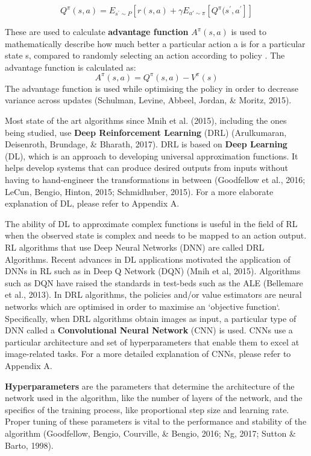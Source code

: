 \[ Q^{\pi}(s,a) = E_{s^{\prime} \sim P}[r(s,a) + \gamma E_{a\prime \sim \pi}[Q^{\pi}(s^{\prime}, a^{\prime}]] \]

These are used to calculate \textbf{advantage function} $A^{\pi}(s,a)$  is used to mathematically describe how much better a particular action a is for a particular state s, compared to randomly selecting an action according to policy . The advantage function is calculated as:  
\[ A^{\pi}(s,a) = Q^{\pi}(s,a) - V^{\pi}(s) \]
The advantage function is used while optimising the policy in order to decrease variance across updates (Schulman, Levine, Abbeel, Jordan, \& Moritz, 2015).

Most state of the art algorithms since Mnih et al. (2015), including the ones being studied, use \textbf{Deep Reinforcement Learning} (DRL) (Arulkumaran, Deisenroth, Brundage, \& Bharath, 2017). DRL is based on \textbf{Deep Learning} (DL), which is an approach to developing universal approximation functions. It helps develop systems that can produce desired outputs from inputs without having to hand-engineer the transformations in between (Goodfellow et al., 2016; LeCun, Bengio, Hinton, 2015; Schmidhuber, 2015). For a more elaborate explanation of DL, please refer to Appendix A.

The ability of DL to approximate complex functions is useful in the field of RL when the observed state is complex and needs to be mapped to an action output. RL algorithms that use Deep Neural Networks (DNN) are called DRL Algorithms. Recent advances in DL applications motivated the application of DNNs in RL such as in Deep Q Network (DQN) (Mnih et al, 2015). Algorithms such as DQN have raised the standards in test-beds such as the ALE (Bellemare et al., 2013). In DRL algorithms, the policies and/or value estimators are neural networks which are optimised in order to maximise an `objective function`. Specifically, when DRL algorithms obtain images as input, a particular type of DNN called a \textbf{Convolutional Neural Network} (CNN) is used. CNNs use a particular architecture and set of hyperparameters that enable them to excel at image-related tasks. For a more detailed explanation of CNNs, please refer to Appendix A.

\textbf{Hyperparameters} are the parameters that determine the architecture of the network used in the algorithm, like the number of layers of the network, and the specifics of the training process, like proportional step size and learning rate. Proper tuning of these parameters is vital to the performance and stability of the algorithm (Goodfellow, Bengio, Courville, \& Bengio, 2016; Ng, 2017; Sutton \& Barto, 1998).

